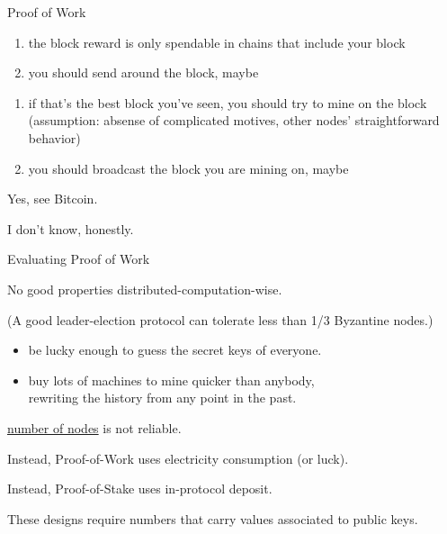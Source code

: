 \documentclass{beamer}
\begin{document}
\begin{frame}{Proof of Work}

\begin{enumerate}
\item the block reward is only spendable in chains that include your block
\item you should send around the block, maybe
\end{enumerate}

\begin{enumerate}
\item if that's the best block you've seen, you should try to mine on the block \\
      (assumption: absense of complicated motives, other nodes' straightforward behavior)
\item you should broadcast the block you are mining on, maybe
\end{enumerate}

\vfill

  Yes, see Bitcoin.

  I don't know, honestly.
\end{frame}

\begin{frame}{Evaluating Proof of Work}

No good properties distributed-computation-wise.

(A good leader-election protocol can tolerate less than 1/3 Byzantine nodes.)

\begin{itemize}
\item be lucky enough to guess the secret keys of everyone.
\end{itemize}

\begin{itemize}
\item buy lots of machines to mine quicker than anybody,\\ rewriting the history from any point in the past.
\end{itemize}

 \underline{number of nodes} is not reliable.

Instead, Proof-of-Work uses electricity consumption (or luck).

Instead, Proof-of-Stake uses in-protocol deposit.

These designs require numbers that carry values associated to public keys.

\end{frame}
\end{document}
